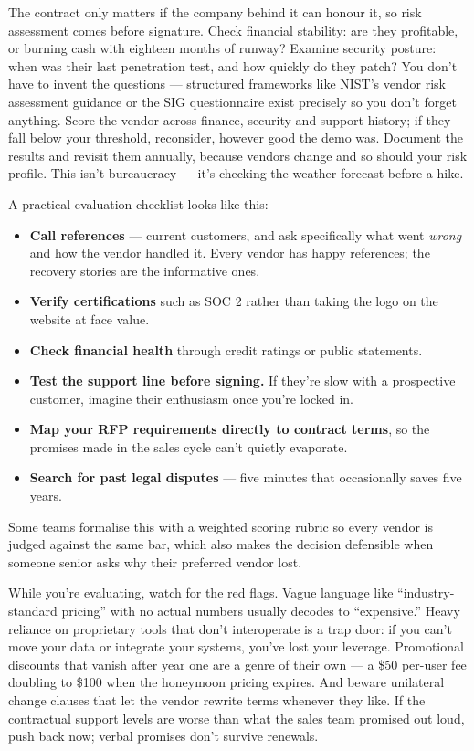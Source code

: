 The contract only matters if the company behind it can honour it, so risk assessment comes before signature. Check financial stability: are they profitable, or burning cash with eighteen months of runway? Examine security posture: when was their last penetration test, and how quickly do they patch? You don't have to invent the questions — structured frameworks like NIST's vendor risk assessment guidance or the SIG questionnaire exist precisely so you don't forget anything. Score the vendor across finance, security and support history; if they fall below your threshold, reconsider, however good the demo was. Document the results and revisit them annually, because vendors change and so should your risk profile. This isn't bureaucracy — it's checking the weather forecast before a hike.


A practical evaluation checklist looks like this:


\begin{itemize}[leftmargin=*]
\item \textbf{Call references} — current customers, and ask specifically what went \emph{wrong} and how the vendor handled it. Every vendor has happy references; the recovery stories are the informative ones.
\item \textbf{Verify certifications} such as SOC 2 rather than taking the logo on the website at face value.
\item \textbf{Check financial health} through credit ratings or public statements.
\item \textbf{Test the support line before signing.} If they're slow with a prospective customer, imagine their enthusiasm once you're locked in.
\item \textbf{Map your RFP requirements directly to contract terms}, so the promises made in the sales cycle can't quietly evaporate.
\item \textbf{Search for past legal disputes} — five minutes that occasionally saves five years.
\end{itemize}

Some teams formalise this with a weighted scoring rubric so every vendor is judged against the same bar, which also makes the decision defensible when someone senior asks why their preferred vendor lost.


While you're evaluating, watch for the red flags. Vague language like ``industry-standard pricing'' with no actual numbers usually decodes to ``expensive.'' Heavy reliance on proprietary tools that don't interoperate is a trap door: if you can't move your data or integrate your systems, you've lost your leverage. Promotional discounts that vanish after year one are a genre of their own — a \$50 per-user fee doubling to \$100 when the honeymoon pricing expires. And beware unilateral change clauses that let the vendor rewrite terms whenever they like. If the contractual support levels are worse than what the sales team promised out loud, push back now; verbal promises don't survive renewals.



